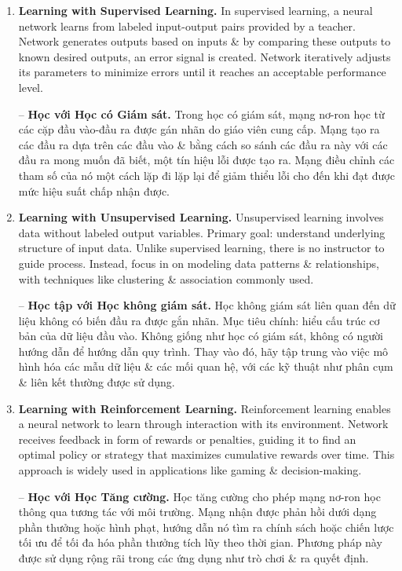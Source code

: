 \documentclass{article}
\begin{document}
\begin{enumerate}
    \item {\bf Learning with Supervised Learning.} In supervised learning, a neural network learns from labeled input-output pairs provided by a teacher. Network generates outputs based on inputs \& by comparing these outputs to known desired outputs, an error signal is created. Network iteratively adjusts its parameters to minimize errors until it reaches an acceptable performance level.

    -- {\bf Học với Học có Giám sát.} Trong học có giám sát, mạng nơ-ron học từ các cặp đầu vào-đầu ra được gán nhãn do giáo viên cung cấp. Mạng tạo ra các đầu ra dựa trên các đầu vào \& bằng cách so sánh các đầu ra này với các đầu ra mong muốn đã biết, một tín hiệu lỗi được tạo ra. Mạng điều chỉnh các tham số của nó một cách lặp đi lặp lại để giảm thiểu lỗi cho đến khi đạt được mức hiệu suất chấp nhận được.
    \item {\bf Learning with Unsupervised Learning.} Unsupervised learning involves data without labeled output variables. Primary goal: understand underlying structure of input data. Unlike supervised learning, there is no instructor to guide process. Instead, focus in on modeling data patterns \& relationships, with techniques like clustering \& association commonly used.

    -- {\bf Học tập với Học không giám sát.} Học không giám sát liên quan đến dữ liệu không có biến đầu ra được gắn nhãn. Mục tiêu chính: hiểu cấu trúc cơ bản của dữ liệu đầu vào. Không giống như học có giám sát, không có người hướng dẫn để hướng dẫn quy trình. Thay vào đó, hãy tập trung vào việc mô hình hóa các mẫu dữ liệu \& các mối quan hệ, với các kỹ thuật như phân cụm \& liên kết thường được sử dụng.
    \item {\bf Learning with Reinforcement Learning.} Reinforcement learning enables a neural network to learn through interaction with its environment. Network receives feedback in form of rewards or penalties, guiding it to find an optimal policy or strategy that maximizes cumulative rewards over time. This approach is widely used in applications like gaming \& decision-making.

    -- {\bf Học với Học Tăng cường.} Học tăng cường cho phép mạng nơ-ron học thông qua tương tác với môi trường. Mạng nhận được phản hồi dưới dạng phần thưởng hoặc hình phạt, hướng dẫn nó tìm ra chính sách hoặc chiến lược tối ưu để tối đa hóa phần thưởng tích lũy theo thời gian. Phương pháp này được sử dụng rộng rãi trong các ứng dụng như trò chơi \& ra quyết định.
\end{enumerate}
\end{document}
